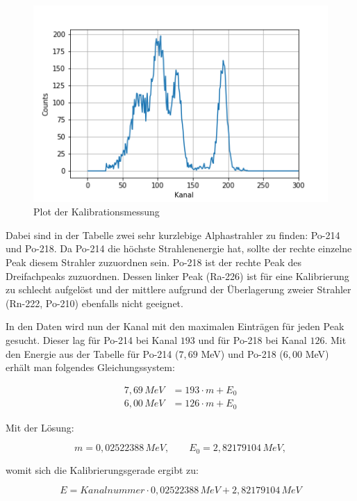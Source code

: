 \begin{figure}[h]
    \centering
    \includegraphics[scale=0.75]{Bilder/kali.png}
    \caption{Plot der Kalibrationsmessung} 
    \label{bild:kali}
\end{figure}


Dabei sind in der Tabelle zwei sehr kurzlebige Alphastrahler zu finden: Po-214 und Po-218. Da Po-214 die höchste Strahlenenergie hat, 
sollte der rechte einzelne Peak diesem Strahler zuzuordnen sein. Po-218 ist der rechte Peak des Dreifachpeaks zuzuordnen. Dessen 
linker Peak (Ra-226) ist für eine Kalibrierung zu schlecht aufgelöst und der mittlere aufgrund der Überlagerung zweier Strahler 
(Rn-222, Po-210) ebenfalls nicht geeignet. \footnotemark
{}

In den Daten wird nun der Kanal mit den maximalen Einträgen für jeden Peak gesucht. Dieser lag für Po-214 bei Kanal $193$ und 
für Po-218 bei Kanal $126$. Mit den Energie aus der Tabelle für Po-214 ($7,69$ MeV) und Po-218 ($6,00$ MeV) erhält man folgendes 
Gleichungssystem:

\begin{align*}
    7,69 \, MeV &= 193 \cdot m + E_0 \\
    6,00 \, MeV &= 126 \cdot m + E_0
\end{align*}

Mit der Lösung:

\begin{equation*}
    m = 0,02522388 \, MeV, \qquad E_0 = 2,82179104 \, MeV,
\end{equation*}

womit sich die Kalibrierungsgerade ergibt zu:

\begin{equation}
    E = Kanalnummer \cdot 0,02522388 \, MeV + 2,82179104 \, MeV
\end{equation}

